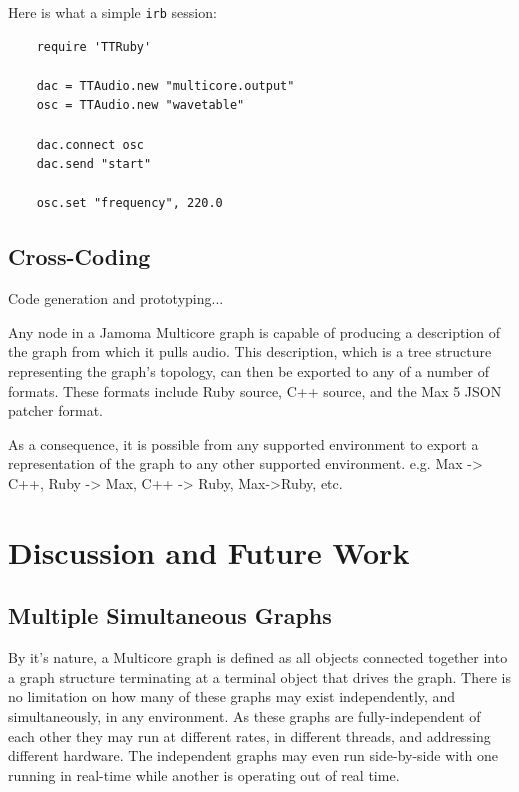 \documentclass[twoside,a4paper]{article}
\begin{document}

Here is what a simple \texttt{irb} session:

\begin{lstlisting}
	require 'TTRuby'
	
 	dac = TTAudio.new "multicore.output"
 	osc = TTAudio.new "wavetable"

	dac.connect osc
	dac.send "start"
	
	osc.set "frequency", 220.0
\end{lstlisting}




\subsection{Cross-Coding} %


Code generation and prototyping...

Any node in a Jamoma Multicore graph is capable of producing a description of the graph from which it pulls audio.  This description, which is a tree structure representing the graph's topology, can then be exported to any of a number of formats.  These formats include Ruby source, C++ source, and the Max 5 JSON patcher format.

As a consequence, it is possible from any supported environment to export a representation of the graph to any other supported environment.  e.g. Max -> C++, Ruby -> Max, C++ -> Ruby, Max->Ruby, etc.






\section{Discussion and Future Work} %

\subsection{Multiple Simultaneous Graphs} %

By it's nature, a Multicore graph is defined as all objects connected together into a graph structure terminating at a terminal object that drives the graph.  There is no limitation on how many of these graphs may exist independently, and simultaneously, in any environment.  As these graphs are fully-independent of each other they may run at different rates, in different threads, and addressing different hardware.  The independent graphs may even run side-by-side with one running in real-time while another is operating out of real time.
\end{document}
